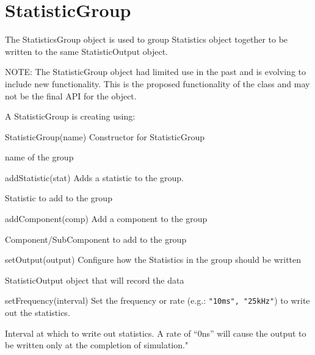 \section{StatisticGroup}

The StatisticsGroup object is used to group Statistics object together
to be written to the same StatisticOutput object.

NOTE: The StatisticGroup object had limited use in the past and is
evolving to include new functionality.  This is the proposed
functionality of the class and may not be the final API for the
object.

A StatisticGroup is creating using:

\begin{functiondoc}{StatisticGroup(name)}
  { Constructor for StatisticGroup }

   name of the group

\end{functiondoc}

\begin{functiondoc}{addStatistic(stat)}
  { Adds a statistic to the group. }

   Statistic to add to the group

  \noreturn
\end{functiondoc}

\begin{functiondoc}{addComponent(comp)}
  { Add a component to the group }

   Component/SubComponent to add to the group

  \noreturn
\end{functiondoc}


\begin{functiondoc}{setOutput(output)}
    { Configure how the Statistics in the group should be written }

     StatisticOutput object that will record the data

    \noreturn
\end{functiondoc}


\begin{functiondoc}{setFrequency(interval)}
  { Set the frequency or rate (e.g.: \lstinline{"10ms", "25kHz"}) to write out
    the statistics.}

   Interval at which to write out statistics.  A rate
  of ``0ns'' will cause the output to be written only at the
  completion of simulation."

  \noreturn
\end{functiondoc}




